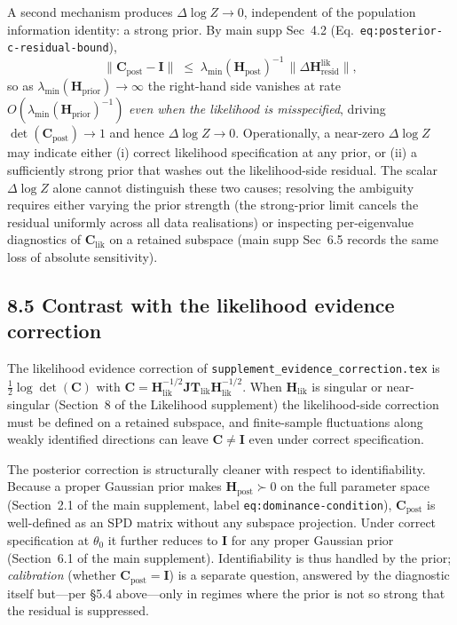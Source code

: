 \documentclass[11pt]{article}
\begin{document}
A second mechanism produces $\Delta\log Z \to 0$, independent of the population
information identity: a strong prior. By main supp Sec~4.2 (Eq.~\texttt{eq:posterior-c-residual-bound}),
\[
\|\mathbf C_{\mathrm{post}} - \mathbf I\|
\;\le\;
\lambda_{\min}(\mathbf H_{\mathrm{post}})^{-1}\,
\|\Delta\mathbf{H}^{\mathrm{lik}}_{\mathrm{resid}}\|,
\]
so as $\lambda_{\min}(\mathbf H_{\mathrm{prior}}) \to \infty$ the right-hand side vanishes
at rate $O(\lambda_{\min}(\mathbf H_{\mathrm{prior}})^{-1})$ \emph{even when the likelihood
is misspecified}, driving $\det(\mathbf C_{\mathrm{post}}) \to 1$ and hence $\Delta\log Z \to 0$.
Operationally, a near-zero $\Delta\log Z$ may indicate either (i) correct likelihood
specification at any prior, or (ii) a sufficiently strong prior that washes out the
likelihood-side residual. The scalar $\Delta\log Z$ alone cannot distinguish these two
causes; resolving the ambiguity requires either varying the prior strength (the strong-prior
limit cancels the residual uniformly across all data realisations) or inspecting per-eigenvalue
diagnostics of $\mathbf C_{\mathrm{lik}}$ on a retained subspace (main supp Sec~6.5 records
the same loss of absolute sensitivity).

\subsection*{8.5 Contrast with the likelihood evidence correction}

The likelihood evidence correction of \texttt{supplement\_evidence\_correction.tex} is
$\tfrac{1}{2}\log\det(\mathbf C)$ with $\mathbf C = \mathbf H_{\mathrm{lik}}^{-1/2}
\mathbf{JT}_{\mathrm{lik}} \mathbf H_{\mathrm{lik}}^{-1/2}$. When $\mathbf H_{\mathrm{lik}}$
is singular or near-singular (Section~8 of the Likelihood supplement) the likelihood-side
correction must be defined on a retained subspace, and finite-sample fluctuations along
weakly identified directions can leave $\mathbf C \neq \mathbf I$ even under correct
specification.

The posterior correction is structurally cleaner with respect to identifiability. Because
a proper Gaussian prior makes $\mathbf H_{\mathrm{post}} \succ 0$ on the full parameter
space (Section~2.1 of the main supplement, label \texttt{eq:dominance-condition}),
$\mathbf C_{\mathrm{post}}$ is well-defined as an SPD matrix without any subspace
projection. Under correct specification at $\theta_0$ it further reduces to $\mathbf I$
for any proper Gaussian prior (Section~6.1 of the main supplement). Identifiability is
thus handled by the prior; \emph{calibration} (whether $\mathbf C_{\mathrm{post}} = \mathbf I$)
is a separate question, answered by the diagnostic itself but---per \S5.4 above---only
in regimes where the prior is not so strong that the residual is suppressed.
\end{document}
